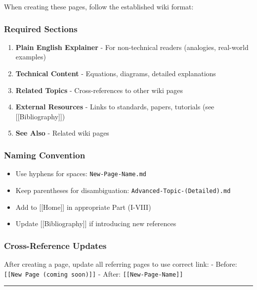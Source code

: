 When creating these pages, follow the established wiki format:

\subsubsection{Required Sections}\label{required-sections}

\begin{enumerate}
\def\labelenumi{\arabic{enumi}.}
\tightlist
\item
  \textbf{Plain English Explainer} - For non-technical readers
  (analogies, real-world examples)
\item
  \textbf{Technical Content} - Equations, diagrams, detailed
  explanations
\item
  \textbf{Related Topics} - Cross-references to other wiki pages
\item
  \textbf{External Resources} - Links to standards, papers, tutorials
  (see {[}{[}Bibliography{]}{]})
\item
  \textbf{See Also} - Related wiki pages
\end{enumerate}

\subsubsection{Naming Convention}\label{naming-convention}

\begin{itemize}
\tightlist
\item
  Use hyphens for spaces: \texttt{New-Page-Name.md}
\item
  Keep parentheses for disambiguation:
  \texttt{Advanced-Topic-(Detailed).md}
\item
  Add to {[}{[}Home{]}{]} in appropriate Part (I-VIII)
\item
  Update {[}{[}Bibliography{]}{]} if introducing new references
\end{itemize}

\subsubsection{Cross-Reference Updates}\label{cross-reference-updates}

After creating a page, update all referring pages to use correct link: -
Before: \texttt{{[}{[}New\ Page\ (coming\ soon){]}{]}} - After:
\texttt{{[}{[}New-Page-Name{]}{]}}

\begin{center}\rule{0.5\linewidth}{0.5pt}\end{center}

